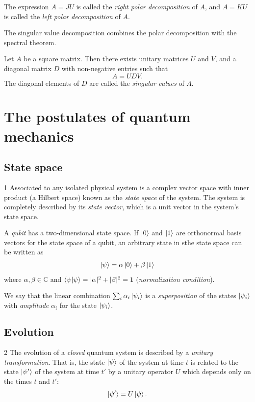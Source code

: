 The expression $A=JU$ is called the \emph{right polar decomposition} of $A$, and $A=KU$ is called the \emph{left polar decomposition} of $A$.

The singular value decomposition combines the polar decomposition with the spectral theorem.

\begin{corollary}
    Let $A$ be a square matrix.
    Then there exists unitary matrices $U$ and $V$, and a diagonal matrix $D$ with non-negative entries such that
    \[
        A = UDV.
    \]
    The diagonal elements of $D$ are called the \emph{singular values} of $A$.
\end{corollary}

\section{The postulates of quantum mechanics}

\subsection{State space}

\begin{postulate}{1}
    Associated to any isolated physical system is a complex vector space with inner product
    (a Hilbert space)
    known as the \emph{state space} of the system.
    The system is completely described by its \emph{state vector}, 
    which is a unit vector in the system's state space.
\end{postulate}

A \emph{qubit} has a two-dimensional state space.
If $\ket{0}$ and $\ket{1}$ are orthonormal basis vectors for the state space of a qubit,
an arbitrary state in sthe state space can be written as
\[
    \ket{\psi} = \alpha\ket{0} + \beta\ket{1}
\]
where $\alpha, \beta \in \mathbb{C}$ and $\braket{\psi|\psi} = \lvert\alpha\rvert^2 + \lvert\beta\rvert^2 = 1$ (\emph{normalization condition}).

We say that the linear combination $\sum_i \alpha_i \ket{\psi_i}$ is a \emph{superposition} of the states $\ket{\psi_i}$ with \emph{amplitude} $\alpha_i$ for the state $\ket{\psi_i}$.

\subsection{Evolution}

\begin{postulate}[Evolution]{2}
    The evolution of a \emph{closed} quantum system is described by a \emph{unitary transformation}.
    That is,
    the state $\ket{\psi}$ of the system at time $t$ is related to the state $\ket{\psi'}$ of the system at time $t'$ by a unitary operator $U$ which depends only on the times $t$ and $t'$:
    \[
        \ket{\psi'} = U\ket{\psi}.
    \]
\end{postulate}

